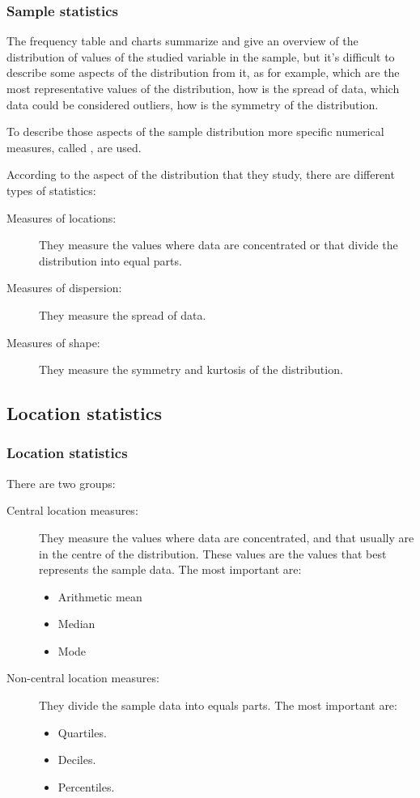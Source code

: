 \begin{frame}
\frametitle{Sample statistics}
The frequency table and charts summarize and give an overview of the distribution of values of the studied variable in
the sample, but it's difficult to describe some aspects of the distribution from it, as for example, which are the most
representative values of the distribution, how is the spread of data, which data could be considered outliers, how is
the symmetry of the distribution. 

To describe those aspects of the sample distribution more specific numerical measures, called
, are used.

According to the aspect of the distribution that they study, there are different types of statistics:
\begin{description}
\item[Measures of locations:] They measure the values where data are concentrated or that divide the distribution into
equal parts. 
\item[Measures of dispersion:] They measure the spread of data.
\item[Measures of shape:] They measure the symmetry and kurtosis of the distribution.  
\end{description}
\end{frame}


\subsection{Location statistics}

\begin{frame}
\frametitle{Location statistics}
There are two groups: 

\begin{description}
\item [Central location measures:] They measure the values where data are concentrated, and that usually are in the
centre of the distribution. 
These values are the values that best represents the sample data. 
The most important are:
\begin{itemize}
\item Arithmetic mean
\item Median
\item Mode
\end{itemize}
\item [Non-central location measures:] They divide the sample data into equals parts. 
The most important are:
\begin{itemize}
\item Quartiles.
\item Deciles.
\item Percentiles. 
\end{itemize}
\end{description}
\end{frame}


